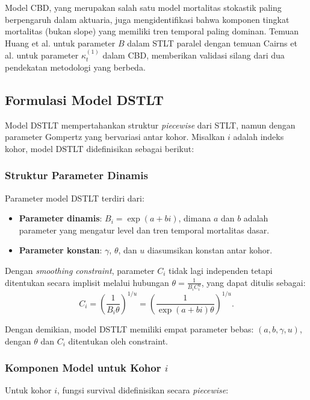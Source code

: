 Model CBD, yang merupakan salah satu model mortalitas stokastik paling berpengaruh dalam aktuaria, juga mengidentifikasi bahwa komponen tingkat mortalitas (bukan slope) yang memiliki tren temporal paling dominan. Temuan Huang et al. untuk parameter $B$ dalam STLT paralel dengan temuan Cairns et al. untuk parameter $\kappa_t^{(1)}$ dalam CBD, memberikan validasi silang dari dua pendekatan metodologi yang berbeda.

\subsection{Formulasi Model DSTLT}

Model DSTLT mempertahankan struktur \textit{piecewise} dari STLT, namun dengan parameter Gompertz yang bervariasi antar kohor. Misalkan $i$ adalah indeks kohor, model DSTLT didefinisikan sebagai berikut:

\subsubsection{Struktur Parameter Dinamis}

Parameter model DSTLT terdiri dari:
\begin{itemize}
    \item \textbf{Parameter dinamis}: $B_i = \exp(a + bi)$, dimana $a$ dan $b$ adalah parameter yang mengatur level dan tren temporal mortalitas dasar.
    \item \textbf{Parameter konstan}: $\gamma$, $\theta$, dan $u$ diasumsikan konstan antar kohor.
\end{itemize}

Dengan \textit{smoothing constraint}, parameter $C_i$ tidak lagi independen tetapi ditentukan secara implisit melalui hubungan $\theta = \frac{1}{B_i C_i^u}$, yang dapat ditulis sebagai:
\begin{equation}
C_i = \left(\frac{1}{B_i \theta}\right)^{1/u} = \left(\frac{1}{\exp(a+bi) \theta}\right)^{1/u}.
\label{eq:dstlt_c_constraint}
\end{equation}

Dengan demikian, model DSTLT memiliki empat parameter bebas: $(a, b, \gamma, u)$, dengan $\theta$ dan $C_i$ ditentukan oleh constraint.

\subsubsection{Komponen Model untuk Kohor $i$}

Untuk kohor $i$, fungsi survival didefinisikan secara \textit{piecewise}:

